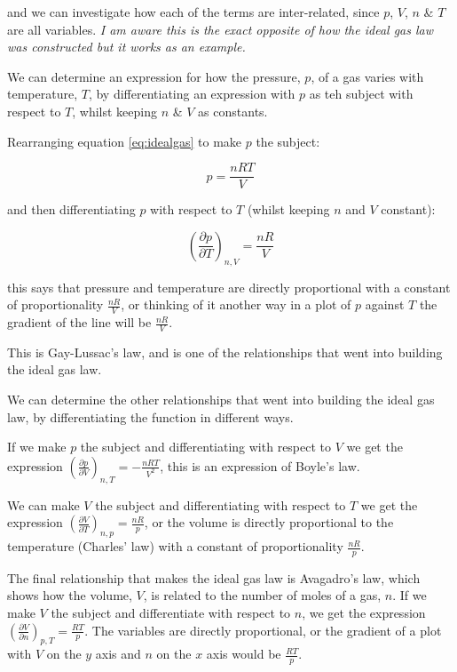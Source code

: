 \documentclass[
]{book}
\begin{document}
and we can investigate how each of the terms are inter-related, since \(p\), \(V\), \(n\) \& \(T\) are all variables. \emph{I am aware this is the exact opposite of how the ideal gas law was constructed but it works as an example.}

We can determine an expression for how the pressure, \(p\), of a gas varies with temperature, \(T\), by differentiating an expression with \(p\) as teh subject with respect to \(T\), whilst keeping \(n\) \& \(V\) as constants.

Rearranging equation \eqref{eq:idealgas} to make \(p\) the subject:

\begin{equation*}
p = \frac{nRT}{V}
\end{equation*}

and then differentiating \(p\) with respect to \(T\) (whilst keeping \(n\) and \(V\) constant):

\begin{equation*}
\left(\frac{\partial p}{\partial T}\right)_{n,V}=\frac{nR}{V}
\end{equation*}

this says that pressure and temperature are directly proportional with a constant of proportionality \(\frac{nR}{V}\), or thinking of it another way in a plot of \(p\) against \(T\) the gradient of the line will be \(\frac{nR}{V}\).

This is Gay-Lussac's law, and is one of the relationships that went into building the ideal gas law.

We can determine the other relationships that went into building the ideal gas law, by differentiating the function in different ways.

If we make \(p\) the subject and differentiating with respect to \(V\) we get the expression \(\left(\frac{\partial p}{\partial V}\right)_{n,T}=-\frac{nRT}{V^2}\), this is an expression of Boyle's law.

We can make \(V\) the subject and differentiating with respect to \(T\) we get the expression \(\left(\frac{\partial V}{\partial T}\right)_{n,p}=\frac{nR}{p}\), or the volume is directly proportional to the temperature (Charles' law) with a constant of proportionality \(\frac{nR}{p}\).

The final relationship that makes the ideal gas law is Avagadro's law, which shows how the volume, \(V\), is related to the number of moles of a gas, \(n\). If we make \(V\) the subject and differentiate with respect to \(n\), we get the expression \(\left(\frac{\partial V}{\partial n}\right)_{p,T}=\frac{RT}{p}\). The variables are directly proportional, or the gradient of a plot with \(V\) on the \(y\) axis and \(n\) on the \(x\) axis would be \(\frac{RT}{p}\).
\end{document}

